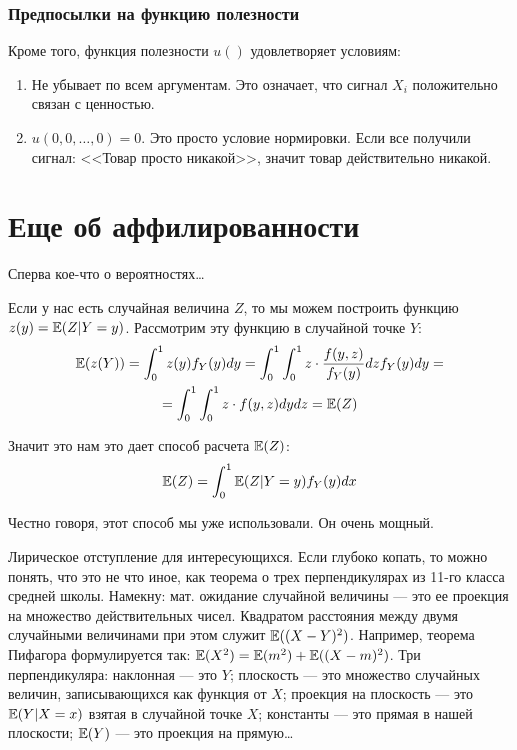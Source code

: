 \subsubsection*{Предпосылки на функцию полезности}
Кроме того, функция полезности $ u() $ удовлетворяет условиям:
\begin{enumerate}
\item Не убывает по всем аргументам. Это означает, что сигнал $ X_{i} $ положительно связан с ценностью.
\item $ u(0,0,\ldots,0)=0 $. Это просто условие нормировки. Если все получили сигнал: <<Товар просто никакой>>, значит товар действительно никакой.
\end{enumerate}






\section{Еще об аффилированности}


Сперва кое-что о вероятностях\ldots

Если у нас есть случайная величина $ Z $, то мы можем построить функцию $z(y)= \mathbb{E}(Z|Y=y) $. Рассмотрим эту функцию в случайной точке $ Y $:
\begin{multline}
\mathbb{E}(z(Y))=\int_{0}^{1}z(y)f_{Y}(y)dy=\int_{0}^{1}\int_{0}^{1}z\cdot \frac{f(y,z)}{f_{Y}(y)}dz f_{Y}(y)dy=\\
=\int_{0}^{1}\int_{0}^{1}z\cdot f(y,z)dydz=\mathbb{E}(Z)
\end{multline}

Значит это нам это дает способ расчета $ \mathbb{E}(Z) $:
\begin{equation}
\label{conditional_way}
\mathbb{E}(Z)=\int_{0}^{1}\mathbb{E}(Z|Y=y)f_{Y}(y)dx
\end{equation}

Честно говоря, этот способ мы уже использовали. Он очень мощный.

Лирическое отступление для интересующихся. Если глубоко копать, то можно понять, что это не что иное, как теорема о трех перпендикулярах из 11-го класса средней школы. Намекну: мат. ожидание случайной величины --- это ее проекция на множество действительных чисел. Квадратом расстояния между двумя случайными величинами при этом служит $ \mathbb{E}((X-Y)^{2}) $. Например, теорема Пифагора формулируется так: $ \mathbb{E}(X^{2})=\mathbb{E}(m^{2})+\mathbb{E}((X-m)^{2}) $. Три перпендикуляра: наклонная --- это $ Y $; плоскость --- это множество случайных величин, записывающихся как функция от $ X $; проекция на плоскость --- это $ \mathbb{E}(Y|X=x) $ взятая в случайной точке $ X $; константы --- это прямая в нашей плоскости; $ \mathbb{E}(Y) $ --- это проекция на прямую\ldots


